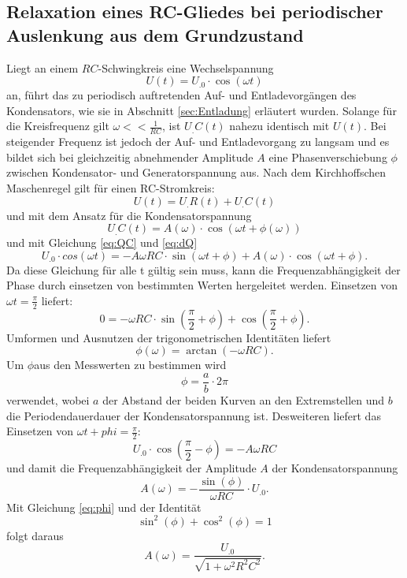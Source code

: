 \subsection{Relaxation eines RC-Gliedes bei periodischer Auslenkung aus dem Grundzustand}
Liegt an einem $RC$-Schwingkreis eine Wechselspannung
\[
U(t)= U_.0\cdot \cos(\omega t)
\]
an, führt das zu periodisch auftretenden Auf- und Entladevorgängen des Kondensators, wie sie in Abschnitt \ref{sec:Entladung} erläutert wurden.
Solange für die Kreisfrequenz gilt $\omega << \frac{1}{RC}$, ist $U_.C(t)$ nahezu identisch mit $U(t)$. Bei steigender Frequenz ist jedoch der Auf- und Entladevorgang zu langsam und es bildet sich bei gleichzeitig abnehmender Amplitude $A$ eine Phasenverschiebung $\phi$ zwischen Kondensator- und Generatorspannung aus.
Nach dem Kirchhoffschen Maschenregel gilt für einen RC-Stromkreis:
\begin{equation}
U(t)=U_.R(t)+U_.C(t)\label{eq:U1}
\end{equation}
und mit dem Ansatz für die Kondensatorspannung
\[
U_.C(t)= A(\omega)\cdot \cos(\omega t + \phi (\omega))
\]
und mit Gleichung \eqref{eq:QC} und \eqref{eq:dQ}
\begin{equation}
U_.0\cdot cos(\omega t) = -A\omega RC\cdot \sin(\omega t + \phi) + A(\omega)\cdot \cos(\omega t + \phi)\text{.}\label{eq:U2}
\end{equation}
Da diese Gleichung für alle t gültig sein muss, kann die Frequenzabhängigkeit der Phase durch einsetzen von bestimmten Werten hergeleitet werden.
Einsetzen von $\omega t=\frac{\pi}{2}$ liefert:
\[
0 = -\omega RC\cdot \sin\left(\frac{\pi}{2}+\phi\right)+ \cos\left(\frac{\pi}{2}+\phi\right)\text{.}
\]
Umformen und Ausnutzen der trigonometrischen Identitäten liefert
\begin{equation}
\phi (\omega)= \arctan(-\omega RC)\text{.}\label{eq:phi}
\end{equation}
Um $\phi$aus den Messwerten zu bestimmen wird
\begin{equation}
\phi = \frac{a}{b}\cdot 2\pi \label{eq:phi1}
\end{equation}
verwendet, wobei $a$ der Abstand der beiden Kurven an den Extremstellen und $b$ die Periodendauerdauer der Kondensatorspannung ist.
Desweiteren liefert das Einsetzen von $\omega t + phi = \frac{\pi}{2}$:
\[
U_.0\cdot \cos\left(\frac{\pi}{2}-\phi\right)= -A\omega RC
\]
und damit die Frequenzabhängigkeit der Amplitude $A$ der Kondensatorspannung
\begin{equation}
A(\omega)=-\frac{\sin(\phi)}{\omega RC}\cdot U_.0 \text{.}\label{eq:A1}
\end{equation}
Mit Gleichung \eqref{eq:phi} und der Identität
\[
\sin^2(\phi)+\cos^2(\phi)=1
\]
folgt daraus
\begin{equation}
A(\omega)=\frac{U_.0}{\sqrt{1+\omega^2R^2C^2}}\text{.}\label{eq:A2}
\end{equation}

